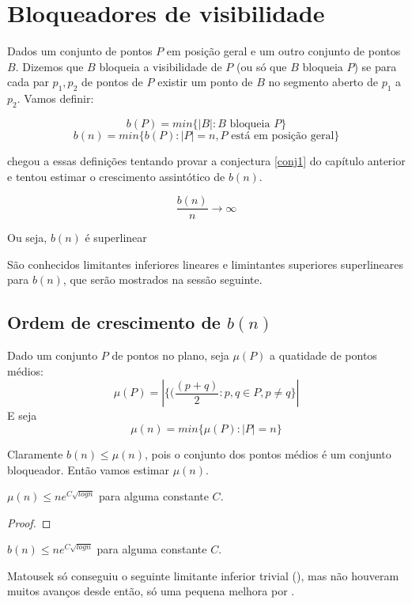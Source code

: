 \chapter{Bloqueadores de visibilidade}

Dados um conjunto de pontos $P$ em posição geral e um outro conjunto de pontos $B$. Dizemos que $B$ bloqueia a visibilidade de $P$ (ou só que $B$ bloqueia $P$) se para cada par $p_1,p_2$ de pontos de $P$ existir um ponto de $B$ no segmento aberto de $p_1$ a $p_2$. Vamos definir:

$$b(P) = min\{|B|:B\text{ bloqueia }P\}$$
$$b(n) = min\{b(P):|P|=n,P\text{ está em posição geral}\}$$

\cite{blockers} chegou a essas definições tentando provar a conjectura \ref{conj1} do capítulo anterior e tentou estimar o crescimento assintótico de $b(n)$.

\begin{conjectura}
    $$\frac{b(n)}{n}\rightarrow\infty$$

    Ou seja, $b(n)$ é superlinear
\end{conjectura}

São conhecidos limitantes inferiores lineares e limintantes superiores superlineares para $b(n)$, que serão mostrados na sessão seguinte.

\section{Ordem de crescimento de $b(n)$}

Dado um conjunto $P$ de pontos no plano, seja $\mu(P)$ a quatidade de pontos médios:
$$\mu(P)=|\{(\frac{(p+q)}{2}:p,q\in P, p\neq q\}|$$
E seja
$$\mu(n)=min\{\mu(P):|P|=n\}$$

Claramente $b(n)\leq \mu(n)$, pois o conjunto dos pontos médios é um conjunto bloqueador. Então vamos estimar $\mu(n)$.

\begin{teorema}
    $\mu(n)\leq ne^{C\sqrt{logn}}$ para alguma constante $C$. 
\end{teorema}
\begin{proof}

\end{proof}

\begin{corolario}
    $b(n)\leq ne^{C\sqrt{logn}}$ para alguma constante $C$. 
\end{corolario}

Matousek só conseguiu o seguinte limitante inferior trivial (\cite{blockers}), mas não houveram muitos avanços desde então, só uma pequena melhora por \cite{block}.

